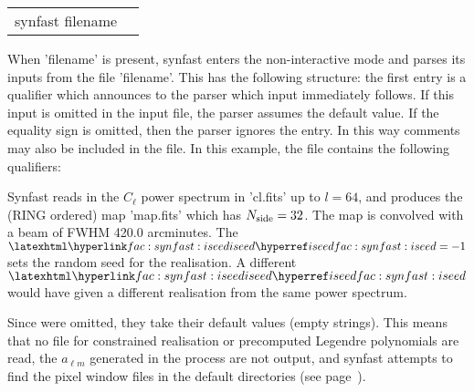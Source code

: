\begin{examples}{2}
{
\begin{tabular}{ll} %
synfast  filename \\
\end{tabular}
}
{When 'filename' is present, synfast enters the non-interactive mode and parses
its inputs from the file 'filename'. This has the following
structure: the first entry is a qualifier which announces to the parser
which input immediately follows. If this input is omitted in the
input file, the parser assumes the default value.
If the equality sign is omitted, then the parser ignores the entry.
In this way comments may also be included in the file.
In this example, the file contains the following qualifiers:\hfill\newline
{}

Synfast reads in the $C_{\ell}$ power spectrum in 'cl.fits' up to $l=64$, and
produces the (RING ordered) map
'map.fits' which has $N_{\rm side}=32$.
The map is convolved with a beam of FWHM 420.0 arcminutes. The $\mylink{fac:synfast:iseed}{iseed}%
=-1$ sets
the random seed for the realisation. A different $\mylink{fac:synfast:iseed}{iseed}%
$ would have given a different 
realisation from the same power spectrum.

Since \hfill\newline
{}
were omitted, they take their default values (empty strings). 
This means that no file for constrained realisation or precomputed
Legendre polynomials are read, the $a_{\ell m}$ generated in the process are not
output, and synfast attempts to find the pixel
window files in the default directories (see page~\pageref{page:defdir}).
}
\end{examples}

